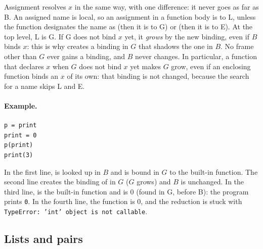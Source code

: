 Assignment resolves $x$ in the same way, with one difference: it never goes
as far as B. An assigned name is local, so an assignment in a function body is
to L, unless the function designates the name as  (then it is to
G) or  (then it is to E). At the top level, L is G. If G does not
bind $x$ yet, it \emph{grows} by the new binding, even if $B$ binds $x$: this is
why  creates a binding in $G$ that shadows the one in $B$. No
frame other than $G$ ever gains a binding, and $B$ never changes.
In particular, a function that declares $x$  when $G$ does not bind $x$
yet makes $G$ grow, even if an enclosing function binds an $x$ of its own: that
binding is not changed, because the search for a  name skips L and E.

\paragraph{Example.}
\begin{lstlisting}
p = print
print = 0
p(print)
print(3)
\end{lstlisting}
In the first line,  is looked up in $B$ and  is bound in $G$ to the
built-in function. The second line creates the binding of  in $G$ ($G$ grows)
and $B$ is unchanged. In the third line,  is the built-in function and
 is $0$ (found in G, before B): the program prints \texttt{0}. In the fourth
line, the function is $0$, and the reduction is stuck with
\texttt{TypeError: 'int' object is not callable}.

\subsection*{Lists and pairs}



